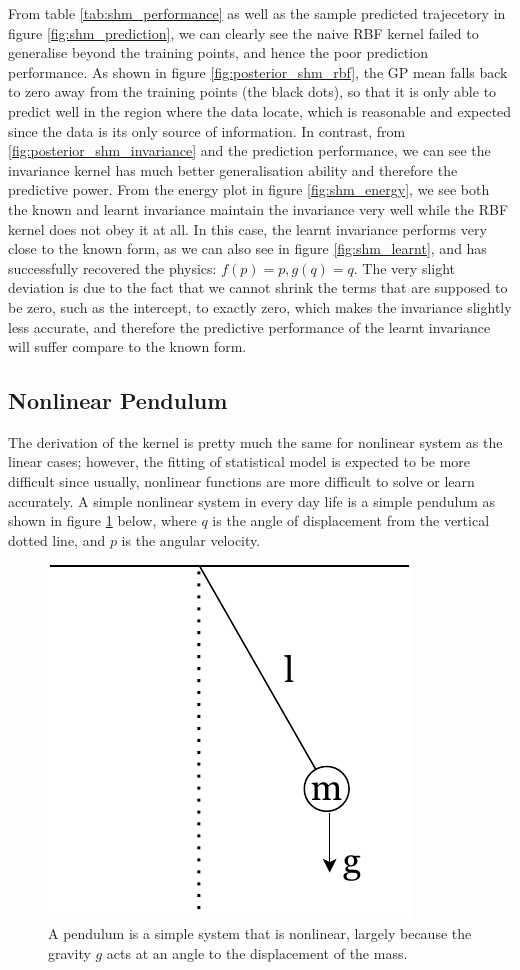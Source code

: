 \documentclass{statsmsc}
\begin{document}
From table \ref{tab:shm_performance} as well as the sample predicted trajecetory in figure \ref{fig:shm_prediction}, we can clearly see the naive RBF kernel failed to generalise beyond the training points, and hence the poor prediction performance. 
As shown in figure \ref{fig:posterior_shm_rbf}, the GP mean falls back to zero away from the training points (the black dots), so that it is only able to predict well in the region where the data locate, which is reasonable and expected since the data is its only source of information. 
In contrast, from \ref{fig:posterior_shm_invariance} and the prediction performance, we can see the invariance kernel has much better generalisation ability and therefore the predictive power.
From the energy plot in figure \ref{fig:shm_energy}, we see both the known and learnt invariance maintain the invariance very well while the RBF kernel does not obey it at all.
In this case, the learnt invariance performs very close to the known form, as we can also see in figure \ref{fig:shm_learnt}, and has successfully recovered the physics: $f(p)=p, g(q)=q$. 
The very slight deviation is due to the fact that we cannot shrink the terms that are supposed to be zero, such as the intercept, to exactly zero, which makes the invariance slightly less accurate, and therefore the predictive performance of the learnt invariance will suffer compare to the known form.


\subsection{Nonlinear Pendulum}
The derivation of the kernel is pretty much the same for nonlinear system as the linear cases; 
however, the fitting of statistical model is expected to be more difficult since usually, nonlinear functions are more difficult to solve or learn accurately.
A simple nonlinear system in every day life is a simple pendulum as shown in figure \ref{fig:pendulum_diagram} below, where $q$ is the angle of displacement from the vertical dotted line, and $p$ is the angular velocity.

\begin{figure}[H]
        \centering
        \includegraphics[width=0.3\linewidth]{../figures/pendulum.pdf}
        \caption{A pendulum is a simple system that is nonlinear, largely because the gravity $g$ acts at an angle to the displacement of the mass.}
        \label{fig:pendulum_diagram}
\end{figure}
\end{document}
